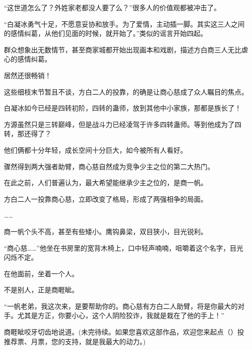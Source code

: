 \begin{this_body}
“这世道怎么了？外姓家老都没人要了么？”很多人的价值观都被冲击了。

“白凝冰勇气十足，不愿意妥协和放手。为了爱情，主动插一脚。其实这三人之间的感情纠葛，从他们见面的时候，就开始了。”类似的谣言开始四起。

群众想象出无数情节，甚至商家城都开始出现画本和戏剧，描述方白商三人无比虐心的感情纠葛。

居然还很畅销！

这些细枝末节暂且不谈，方白二人的投靠，的确是让商心慈成了众人瞩目的焦点。

白凝冰如今已经是四转初阶，四转的蛊师，放到其他中小家族，那都是族长了！

方源虽然只是三转巅峰，但是战斗力已经凌驾于许多四转蛊师。等到他成为了四转，那还得了？

他们俩都十分年轻，成长空间十分巨大，如今被所有人看好。

骤然得到两大强者助臂，商心慈自然成为竞争少主之位的第二大热门。

在此之前，人们普遍认为，最大希望能继承少主之位的，是商一帆。

方白二人一投靠商心慈，立即改变了格局，形成了两强相争的局面。

……

商一帆个头不高，甚至有些矮小。鹰钩鼻梁，双目狭小，目光锐利。

“商心慈……”他坐在书房里的宽背木椅上，口中轻声喃喃，咀嚼着这个名字，目光闪烁不定。

在他面前，坐着一个人。

不是别人，正是商睚眦。

“一帆老弟，我这次来，是要帮助你的。商心慈有方白二人助臂，将是你最大的对手。尤其是方正，你要小心，这个人阴险狡诈，我就是栽在了他的手上！”

商睚眦咬牙切齿地说道。(未完待续。如果您喜欢这部作品，欢迎您来起点（）投推荐票、月票，您的支持，就是我最大的动力。)

\end{this_body}


